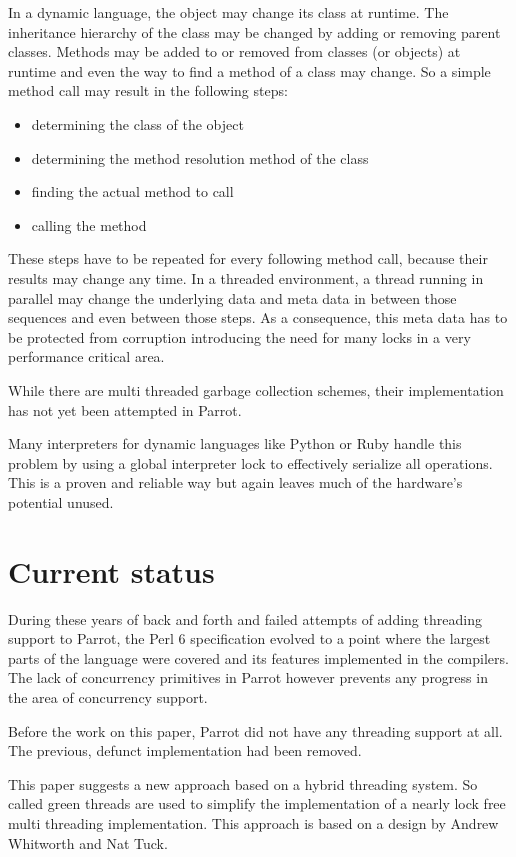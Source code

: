 \documentclass[bachelor,english]{hgbthesis}
\begin{document}
In a dynamic language, the object may change its class at runtime. The inheritance hierarchy of the class may be changed by adding or removing parent classes. Methods may be added to or removed from classes (or objects) at runtime and even the way to find a method of a class may change. So a simple method call may result in the following steps:
%
\begin{itemize}
\item determining the class of the object
\item determining the method resolution method of the class
\item finding the actual method to call
\item calling the method
\end{itemize}
%
These steps have to be repeated for every following method call, because their results may change any time. In a threaded environment, a thread running in parallel may change the underlying data and meta data in between those sequences and even between those steps. As a consequence, this meta data has to be protected from corruption introducing the need for many locks in a very performance critical area.

While there are multi threaded garbage collection schemes, their implementation has not yet been attempted in Parrot.

Many interpreters for dynamic languages like Python or Ruby handle this problem by using a global interpreter lock to effectively serialize all operations. This is a proven and reliable way but again leaves much of the hardware's potential unused.

\section{Current status}

During these years of back and forth and failed attempts of adding threading support to Parrot, the Perl 6 specification evolved to a point where the largest parts of the language were covered and its features implemented in the compilers. The lack of concurrency primitives in Parrot however prevents any progress in the area of concurrency support.

Before the work on this paper, Parrot did not have any threading support at all. The previous, defunct implementation had been removed.

This paper suggests a new approach based on a hybrid threading system. So called green threads are used to simplify the implementation of a nearly lock free multi threading implementation. This approach is based on a design by Andrew Whitworth and Nat Tuck.
\end{document}
